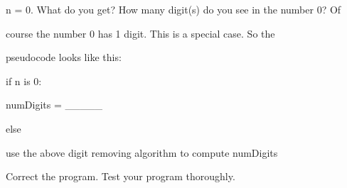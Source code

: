 n = 0. What do you get? How many digit(s) do you see in the number 0? Of

course the number 0 has 1 digit. This is a special case. So the

pseudocode looks like this:



\begin{console}

if n is 0:

   numDigits = _____             

else

   use the above digit removing algorithm to compute numDigits 

\end{console}

Correct the program. Test your program thoroughly.


